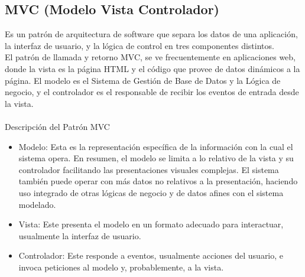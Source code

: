 \documentclass[10pt,a4paper]{report}
\begin{document}
\subsection{MVC (Modelo Vista Controlador)}
\bigskip
Es un patr\'{o}n de arquitectura de software que separa los datos de una aplicaci\'{o}n, la interfaz de usuario, y la l\'{o}gica de control en tres componentes distintos.\\

El patr\'{o}n de llamada y retorno MVC, se ve frecuentemente en aplicaciones web, donde la vista es la p\'{a}gina HTML y el c\'{o}digo que provee de datos din\'{a}micos a la p\'{a}gina. El modelo es el Sistema de Gesti\'{o}n de Base de Datos y la L\'{o}gica de negocio, y el controlador es el responsable de recibir los eventos de entrada desde la vista.\\\\

Descripci\'{o}n del Patr\'{o}n MVC
\bigskip
\begin{itemize}

\item Modelo: Esta es la representaci\'{o}n específica de la informaci\'{o}n con la cual el sistema opera. En resumen, el modelo se limita a lo relativo de la vista y su controlador facilitando las presentaciones visuales complejas. El sistema tambi\'{e}n puede operar con m\'{a}s datos no relativos a la presentaci\'{o}n, haciendo uso integrado de otras l\'{o}gicas de negocio y de datos afines con el sistema modelado.

\item Vista: Este presenta el modelo en un formato adecuado para interactuar, usualmente la interfaz de usuario.

\item Controlador: Este responde a eventos, usualmente acciones del usuario, e invoca peticiones al modelo y, probablemente, a la vista.
\end{itemize}
\bigskip
\newpage
\end{document}
